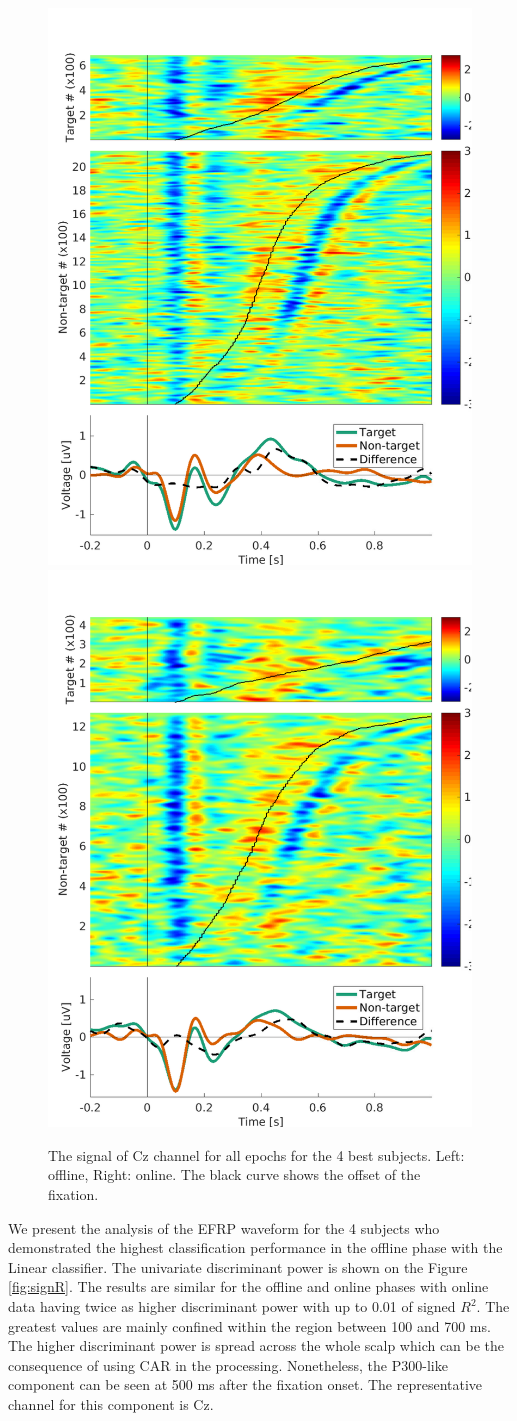 \documentclass[12pt]{iopart}
\begin{document}
\begin{figure}[!t]
    \includegraphics[trim={0cm 0cm 1.5cm 0cm},clip,width=0.45\columnwidth]{../images/offline/Epochs_GA_chCz_Saggregate_objrec_subjects_popuponline_s1.pdf}
    \includegraphics[trim={0cm 0cm 1.5cm 0cm},clip,width=0.45\columnwidth]{../images/online/Epochs_GA_chCz_Saggregate_objrec_subjects_popuponline_s1.pdf}
    \caption{The signal of Cz channel for all epochs for the 4 best subjects. Left: offline, Right: online.
        The black curve shows the offset of the fixation.
    }
\label{fig:epochsCz}
\end{figure}

We present the analysis of the EFRP waveform for the 4 subjects who demonstrated
the highest classification performance in the offline phase with the Linear classifier.
The univariate discriminant power is shown on the Figure \ref{fig:signR}.
The results are similar for the offline and online phases with online data having twice
as higher discriminant power with up to 0.01 of signed $R^2$.
The greatest values are mainly confined within the region between 100 and 700 ms.
The higher discriminant power is spread across the whole scalp which can be the consequence
of using CAR in the processing. Nonetheless, the P300-like component can be seen at 500 ms
after the fixation onset. The representative channel for this component is Cz.
\end{document}
